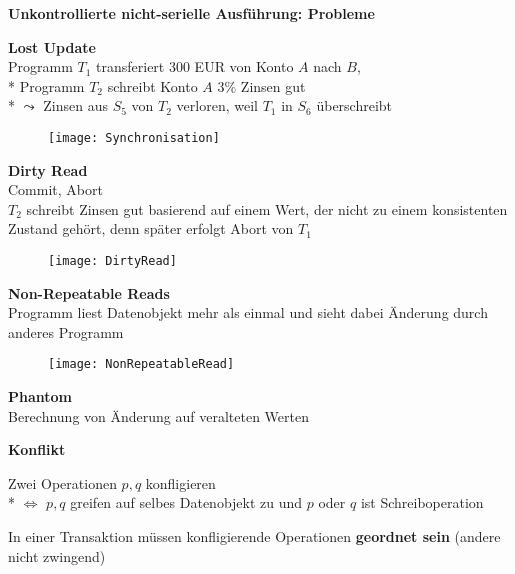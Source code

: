 \textbf{Unkontrollierte nicht-serielle Ausführung: Probleme}
\begin{items}
	\item \textbf{Lost Update}\\
		 Programm \( T_1 \) transferiert 300 EUR von Konto \( A \) nach \( B \),
		\\*
		Programm \( T_2 \) schreibt Konto \( A \) \( 3 \% \) Zinsen gut
		\\*
		\( \leadsto \) Zinsen aus \( S_5 \) von \( T_2 \) verloren, weil \( T_1 \) in \( S_6 \) überschreibt

	\begin{figure}[H]\centering\label{Synchronisation}\texttt{[image: Synchronisation]}\end{figure}
	
	\item \textbf{Dirty Read}\\
		Commit, Abort \\
		\( T_2 \) schreibt Zinsen gut basierend auf einem Wert, der nicht zu einem konsistenten Zustand gehört, denn später erfolgt Abort von \( T_1 \)

	\begin{figure}[H]\centering\label{DirtyRead}\texttt{[image: DirtyRead]}\end{figure}
	
	\item \textbf{Non-Repeatable Reads}\\
		 Programm liest Datenobjekt mehr als einmal und sieht dabei Änderung durch anderes Programm
	\begin{figure}[H]\centering\label{NonRepeatableRead}\texttt{[image: NonRepeatableRead]}\end{figure}
	
	\item \textbf{Phantom}\\
		Berechnung von Änderung auf veralteten Werten
\end{items}

\textbf{Konflikt}
\begin{items}
	\item Zwei Operationen \( p, q \) konfligieren
		\\*
		\( \Leftrightarrow \) \( p,q \) greifen auf selbes Datenobjekt zu und \( p \) oder \( q \) ist Schreiboperation
	\item In einer Transaktion müssen konfligierende Operationen \textbf{geordnet sein} (andere nicht zwingend)
\end{items}

